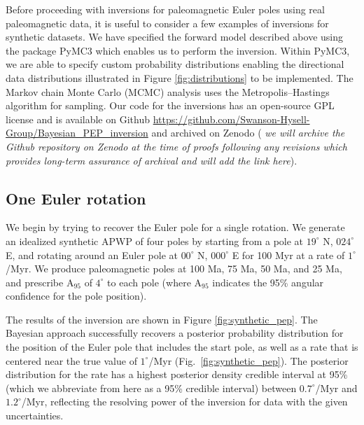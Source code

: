 \documentclass[11pt,letterpaper]{article}
\begin{document}
Before proceeding with inversions for paleomagnetic Euler poles using real paleomagnetic data, it is useful to consider a few examples of inversions for synthetic datasets. We have specified the forward model described above using the package PyMC3 \citep{Salvatier2016a} which enables us to perform the inversion. Within PyMC3, we are able to specify custom probability distributions enabling the directional data distributions illustrated in Figure \ref{fig:distributions} to be implemented. The Markov chain Monte Carlo (MCMC) analysis uses the Metropolis–Hastings algorithm for sampling. Our code for the inversions has an open-source GPL license and is available on Github \url{https://github.com/Swanson-Hysell-Group/Bayesian_PEP_inversion} and archived on Zenodo ( \textit{we will archive the Github repository on Zenodo at the time of proofs following any revisions which provides long-term assurance of archival and will add the link here}).


\subsection*{One Euler rotation}
\label{sec:one_stage_pole}
We begin by trying to recover the Euler pole for a single rotation. We generate an idealized synthetic APWP of four poles by starting from a pole at $19^\circ$ N, $024^\circ$ E, and rotating around an Euler pole at $00^\circ$ N, $000^\circ$ E for 100 Myr at a rate of $1^\circ$/Myr. We produce paleomagnetic poles at 100 Ma, 75 Ma, 50 Ma, and 25 Ma, and prescribe A$_{95}$ of $4^\circ$ to each pole (where A$_{95}$ indicates the 95\% angular confidence for the pole position).

The results of the inversion are shown in Figure \ref{fig:synthetic_pep}. The Bayesian approach successfully recovers a posterior probability distribution for the position of the Euler pole that includes the start pole, as well as a rate that is centered near the true value of $1^\circ$/Myr (Fig.~\ref{fig:synthetic_pep}). The posterior distribution for the rate has a highest posterior density credible interval at 95\% (which we abbreviate from here as a 95\% credible interval) between $0.7^\circ$/Myr and $1.2^\circ$/Myr, reflecting the resolving power of the inversion for data with the given uncertainties.
\end{document}
